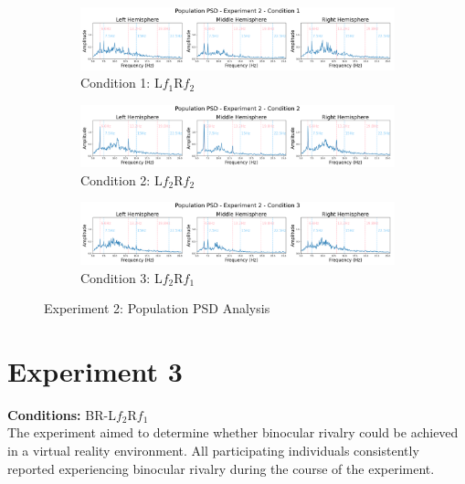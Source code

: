 \begin{figure}[h]
    \centering
    
    \begin{subfigure}{1.0\textwidth}
        \includegraphics[width=\linewidth]{images/results/e110.png}
        \caption{Condition 1: L$f_{1}$R$f_{2}$}
        \label{fig:e110}
    \end{subfigure}
    

    \begin{subfigure}{1.0\textwidth}
        \includegraphics[width=\linewidth]{images/results/e111.png}
        \caption{Condition 2: L$f_{2}$R$f_{2}$}
        \label{fig:e111}
    \end{subfigure}
    
    \begin{subfigure}{1.0\textwidth}
        \includegraphics[width=\linewidth]{images/results/e112.png}
        \caption{Condition 3: L$f_{2}$R$f_{1}$}
        \label{fig:e112}
    \end{subfigure}
    
    \caption{Experiment 2: Population PSD Analysis}
    \label{fig:e2_population}
\end{figure}


\clearpage
\section{Experiment 3}
\textbf{Conditions:} BR-L$f_{2}$R$f_{1}$ \\

The experiment aimed to determine whether binocular rivalry could be achieved in a virtual reality environment. All participating individuals consistently reported experiencing binocular rivalry during the course of the experiment.

